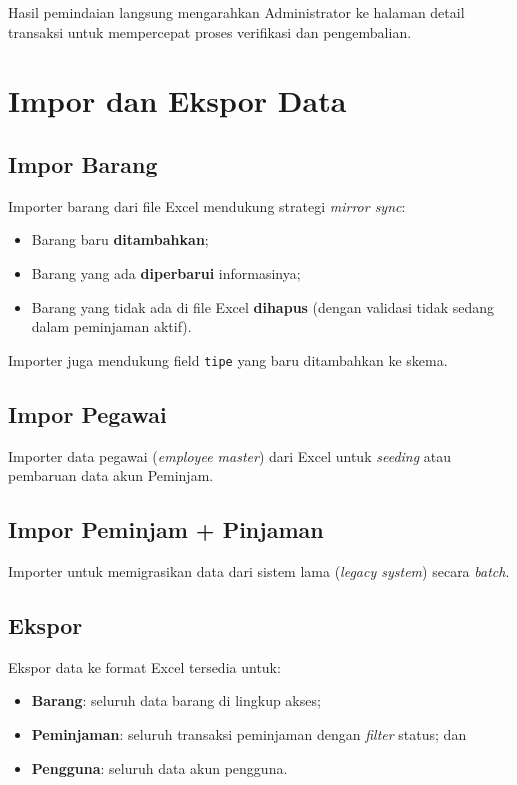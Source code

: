\documentclass[
  12pt,
  a4paper,
  oneside,
  final
]{report}
\begin{document}
Hasil pemindaian langsung mengarahkan Administrator ke halaman
detail transaksi untuk mempercepat proses verifikasi dan
pengembalian.

\section{Impor dan Ekspor Data}

\subsection{Impor Barang}
Importer barang dari file Excel mendukung strategi
{\it mirror sync}:
\begin{itemize}
  \item Barang baru {\bfseries ditambahkan};
  \item Barang yang ada {\bfseries diperbarui} informasinya;
  \item Barang yang tidak ada di file Excel {\bfseries dihapus}
        (dengan validasi tidak sedang dalam peminjaman aktif).
\end{itemize}

Importer juga mendukung field \texttt{tipe} yang baru ditambahkan
ke skema.

\subsection{Impor Pegawai}
Importer data pegawai ({\it employee master}) dari Excel
untuk {\it seeding} atau pembaruan data akun Peminjam.

\subsection{Impor Peminjam + Pinjaman}
Importer untuk memigrasikan data dari sistem lama
({\it legacy system}) secara {\it batch}.

\subsection{Ekspor}
Ekspor data ke format Excel tersedia untuk:
\begin{itemize}
  \item {\bfseries Barang}: seluruh data barang di lingkup akses;
  \item {\bfseries Peminjaman}: seluruh transaksi peminjaman
        dengan {\it filter} status; dan
  \item {\bfseries Pengguna}: seluruh data akun pengguna.
\end{itemize}
\end{document}
